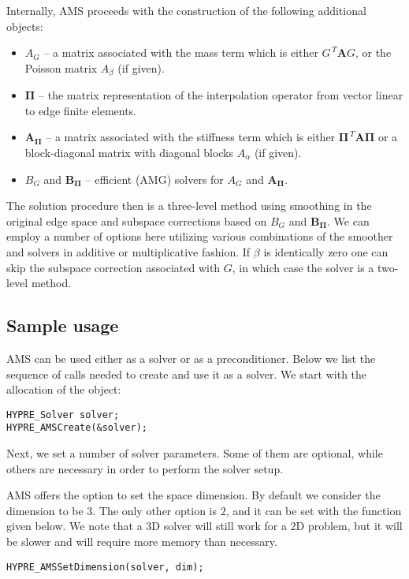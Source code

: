 \noindent
Internally, AMS proceeds with the construction of the following additional objects:
\begin{itemize}
\item $A_G$ -- a matrix associated with the mass term which is either $G^{\,T} {\mathbf A} G$, or the Poisson matrix $A_\beta$ (if given).
\item ${\mathbf \Pi}$ -- the matrix representation of the interpolation operator
from vector linear to edge finite elements.
\item ${\mathbf A}_{{\mathbf \Pi}}$ -- a matrix associated with the stiffness term which is either  ${\mathbf \Pi}^{\,T} {\mathbf A} {\mathbf \Pi}$ or a block-diagonal matrix with diagonal blocks $A_\alpha$ (if given).
\item $B_G$ and ${\mathbf B}_{{\mathbf \Pi}}$ -- efficient (AMG) solvers for $A_G$ and ${\mathbf A}_{{\mathbf \Pi}}$.
\end{itemize}
The solution procedure then is a three-level method using smoothing in
the original edge space and subspace corrections based on $B_G$ and ${\mathbf B}_{{\mathbf \Pi}}$.
We can employ a number of options here utilizing various combinations of the smoother
and solvers in additive or multiplicative fashion.
If $\beta$ is identically zero one can skip the subspace correction associated
with $G$, in which case the solver is a two-level method.

\subsection{Sample usage}
AMS can be used either as a solver or as a preconditioner.
Below we list the sequence of \hypre{} calls
needed to create and use it as a solver.
We start with the allocation of the  object:
\begin{display}\begin{verbatim}
HYPRE_Solver solver;
HYPRE_AMSCreate(&solver);
\end{verbatim}\end{display}

Next, we set a number of solver parameters. Some of them are
optional, while others are necessary in order to perform the
solver setup.

AMS offers the option to set the space dimension.
By default we consider the dimension to be $3$. The only
other option is $2$, and it can be set with the function given below.
We note that a 3D solver will still work for a 2D problem,
but it will be slower and will require more memory than necessary.
\begin{display}\begin{verbatim}
HYPRE_AMSSetDimension(solver, dim);
\end{verbatim}\end{display}

